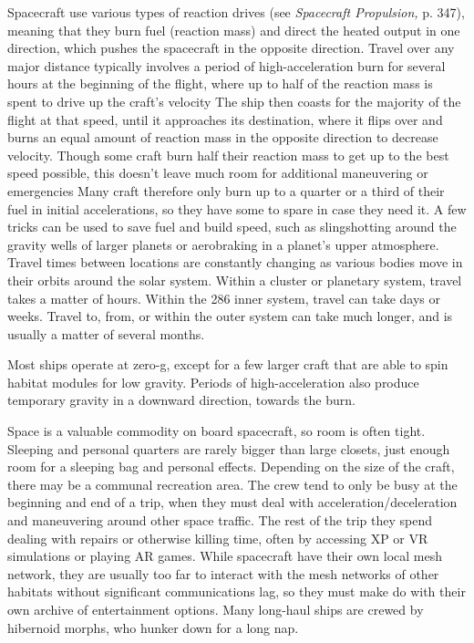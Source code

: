 Spacecraft use various types of reaction drives (see 
\textit{Spacecraft Propulsion,} p. 347), meaning that they burn 
fuel (reaction mass) and direct the heated output in 
one direction, which pushes the spacecraft in the opposite
direction. Travel over any major distance typically
involves a period of high-acceleration burn for several 
hours at the beginning of the flight, where up to half of 
the reaction mass is spent to drive up the craft's velocity
The ship then coasts for the majority of the flight at
that speed, until it approaches its destination, where it 
flips over and burns an equal amount of reaction mass 
in the opposite direction to decrease velocity.
Though some craft burn half their reaction mass 
to get up to the best speed possible, this doesn't leave 
much room for additional maneuvering or emergencies
Many craft therefore only burn up to a quarter
or a third of their fuel in initial accelerations, so they 
have some to spare in case they need it. A few tricks 
can be used to save fuel and build speed, such as slingshotting
around the gravity wells of larger planets or
aerobraking in a planet's upper atmosphere.
Travel times between locations are constantly 
changing as various bodies move in their orbits 
around the solar system. Within a cluster or planetary 
system, travel takes a matter of hours. Within the 
286
inner system, travel can take days or weeks. Travel to, 
from, or within the outer system can take much longer, 
and is usually a matter of several months.

Most ships operate at zero-g, except for a few larger 
craft that are able to spin habitat modules for low 
gravity. Periods of high-acceleration also produce 
temporary gravity in a downward direction, towards 
the burn.

Space is a valuable commodity on board spacecraft, 
so room is often tight. Sleeping and personal quarters 
are rarely bigger than large closets, just enough room 
for a sleeping bag and personal effects. Depending 
on the size of the craft, there may be a communal 
recreation area. The crew tend to only be busy at the 
beginning and end of a trip, when they must deal with 
acceleration/deceleration and maneuvering around 
other space traffic. The rest of the trip they spend 
dealing with repairs or otherwise killing time, often 
by accessing XP or VR simulations or playing AR 
games. While spacecraft have their own local mesh 
network, they are usually too far to interact with the 
mesh networks of other habitats without significant 
communications lag, so they must make do with 
their own archive of entertainment options. Many 
long-haul ships are crewed by hibernoid morphs, who 
hunker down for a long nap.

